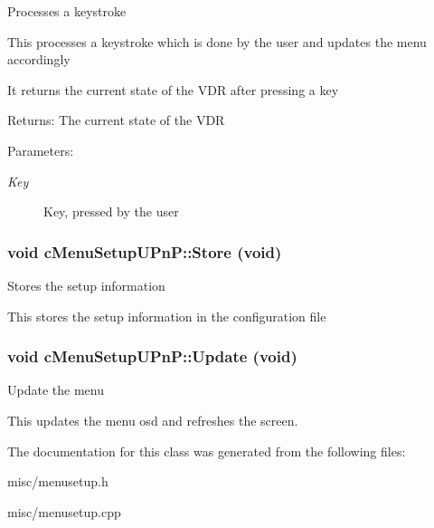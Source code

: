 Processes a keystroke

This processes a keystroke which is done by the user and updates the menu accordingly

It returns the current state of the VDR after pressing a key

\begin{Desc}
\item[Returns:]The current state of the VDR \end{Desc}
\begin{Desc}
\item[Parameters:]
\begin{description}
\item[{\em Key}]Key, pressed by the user \end{description}
\end{Desc}
\hypertarget{classcMenuSetupUPnP_e90738a7757dcc01e64e8ccad2f8a0e6}{
\subsubsection[{Store}]{\setlength{\rightskip}{0pt plus 5cm}void cMenuSetupUPnP::Store (void)}}
\label{classcMenuSetupUPnP_e90738a7757dcc01e64e8ccad2f8a0e6}


Stores the setup information

This stores the setup information in the configuration file \hypertarget{classcMenuSetupUPnP_ed45944671b8974f7639aefee11e8f50}{
\subsubsection[{Update}]{\setlength{\rightskip}{0pt plus 5cm}void cMenuSetupUPnP::Update (void)}}
\label{classcMenuSetupUPnP_ed45944671b8974f7639aefee11e8f50}


Update the menu

This updates the menu osd and refreshes the screen. 

The documentation for this class was generated from the following files:\begin{CompactItemize}
\item 
misc/menusetup.h\item 
misc/menusetup.cpp\end{CompactItemize}
